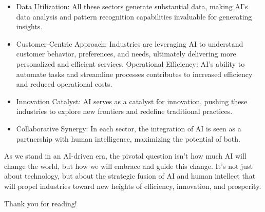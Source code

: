 \documentclass[
]{article}
\providecommand{\tightlist}{%
  \setlength{\itemsep}{0pt}\setlength{\parskip}{0pt}}
\begin{document}
\begin{itemize}
\tightlist
\item
  Data Utilization: All these sectors generate substantial data, making AI's data analysis and pattern recognition capabilities invaluable for generating insights.
\item
  Customer-Centric Approach: Industries are leveraging AI to understand customer behavior, preferences, and needs, ultimately delivering more personalized and efficient services.
  Operational Efficiency: AI's ability to automate tasks and streamline processes contributes to increased efficiency and reduced operational costs.
\item
  Innovation Catalyst: AI serves as a catalyst for innovation, pushing these industries to explore new frontiers and redefine traditional practices.
\item
  Collaborative Synergy: In each sector, the integration of AI is seen as a partnership with human intelligence, maximizing the potential of both.
\end{itemize}

As we stand in an AI-driven era, the pivotal question isn't how much AI will change the world, but how we will embrace and guide this change. It's not just about technology, but about the strategic fusion of AI and human intellect that will propel industries toward new heights of efficiency, innovation, and prosperity.

Thank you for reading!
\end{document}
